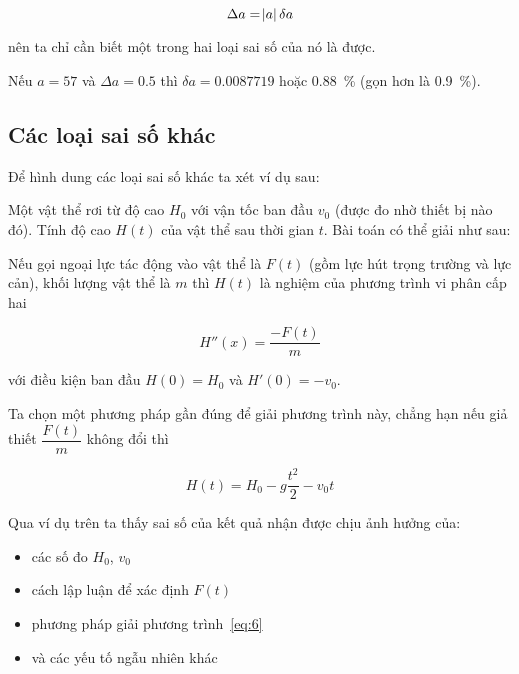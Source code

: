 \documentclass[../../Lectures.tex]{subfiles}
\begin{document}
\begin{equation} \label{eq:5}
    \Delta a = \abs{a}\delta a
\end{equation}

nên ta chỉ cần biết một trong hai loại sai số của nó là được.

\begin{exmp}
    Nếu \(a = \num{57}\) và \(\Delta a = \num{0.5}\) thì \(\delta a =
    \num{0.0087719}\) hoặc \SI{0.88}{\percent} (gọn hơn là \SI{0.9}{\percent}).
\end{exmp}

\subsection{Các loại sai số khác}

Để hình dung các loại sai số khác ta xét ví dụ sau:

\begin{exmp}
    Một vật thể rơi từ độ cao \(H_0\) với vận tốc ban đầu \(v_0\) (được đo nhờ
    thiết bị nào đó). Tính độ cao \(H(t)\) của vật thể sau thời gian \(t\). Bài
    toán có thể giải như sau:

    Nếu gọi ngoại lực tác động vào vật thể là \(F(t)\) (gồm lực hút trọng trường
    và lực cản), khối lượng vật thể là \(m\) thì \(H(t)\) là nghiệm của phương
    trình vi phân cấp hai

    \begin{equation} \label{eq:6}
        H''(x) = \frac{-F(t)}{m}
    \end{equation}

    với điều kiện ban đầu \(H(0) = H_0\) và \(H'(0) = -v_0\).

    Ta chọn một phương pháp gần đúng để giải phương trình này, chẳng hạn nếu giả
    thiết \(\dfrac{F(t)}{m}\) không đổi thì

    \[H(t) = H_0 - g\frac{t^2}{2} -v_0 t\]
\end{exmp}

Qua ví dụ trên ta thấy sai số của kết quả nhận được chịu ảnh hưởng của:

\begin{itemize}
    \item các số đo \(H_0\), \(v_0\)
    \item cách lập luận để xác định \(F(t)\)
    \item phương pháp giải phương trình~\ref{eq:6}
    \item và các yếu tố ngẫu nhiên khác
\end{itemize}
\end{document}
